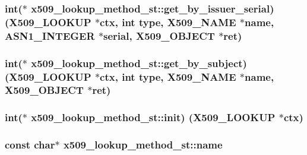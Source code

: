 \subsubsection[{\texorpdfstring{get\+\_\+by\+\_\+issuer\+\_\+serial}{get_by_issuer_serial}}]{\setlength{\rightskip}{0pt plus 5cm}int($\ast$ x509\+\_\+lookup\+\_\+method\+\_\+st\+::get\+\_\+by\+\_\+issuer\+\_\+serial) ({\bf X509\+\_\+\+L\+O\+O\+K\+UP} $\ast$ctx, int {\bf type}, {\bf X509\+\_\+\+N\+A\+ME} $\ast${\bf name}, {\bf A\+S\+N1\+\_\+\+I\+N\+T\+E\+G\+ER} $\ast$serial, {\bf X509\+\_\+\+O\+B\+J\+E\+CT} $\ast$ret)}\hypertarget{structx509__lookup__method__st_af97ec1a34b72c8892d9b16e90e99b9f2}{}\label{structx509__lookup__method__st_af97ec1a34b72c8892d9b16e90e99b9f2}
\subsubsection[{\texorpdfstring{get\+\_\+by\+\_\+subject}{get_by_subject}}]{\setlength{\rightskip}{0pt plus 5cm}int($\ast$ x509\+\_\+lookup\+\_\+method\+\_\+st\+::get\+\_\+by\+\_\+subject) ({\bf X509\+\_\+\+L\+O\+O\+K\+UP} $\ast$ctx, int {\bf type}, {\bf X509\+\_\+\+N\+A\+ME} $\ast${\bf name}, {\bf X509\+\_\+\+O\+B\+J\+E\+CT} $\ast$ret)}\hypertarget{structx509__lookup__method__st_a2d6e3c3cc73f583d6d970abe12b65df2}{}\label{structx509__lookup__method__st_a2d6e3c3cc73f583d6d970abe12b65df2}
\subsubsection[{\texorpdfstring{init}{init}}]{\setlength{\rightskip}{0pt plus 5cm}int($\ast$ x509\+\_\+lookup\+\_\+method\+\_\+st\+::init) ({\bf X509\+\_\+\+L\+O\+O\+K\+UP} $\ast$ctx)}\hypertarget{structx509__lookup__method__st_a04ca0ebad723cae3fa9cb487c56e09a0}{}\label{structx509__lookup__method__st_a04ca0ebad723cae3fa9cb487c56e09a0}
\subsubsection[{\texorpdfstring{name}{name}}]{\setlength{\rightskip}{0pt plus 5cm}const char$\ast$ x509\+\_\+lookup\+\_\+method\+\_\+st\+::name}\hypertarget{structx509__lookup__method__st_a57a76d2d34d7749b3874c7809337390c}{}\label{structx509__lookup__method__st_a57a76d2d34d7749b3874c7809337390c}
